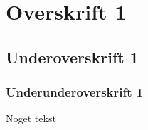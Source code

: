 \section{Overskrift 1}

\subsection{Underoverskrift 1}

\subsubsection{Underunderoverskrift 1}

Noget tekst

